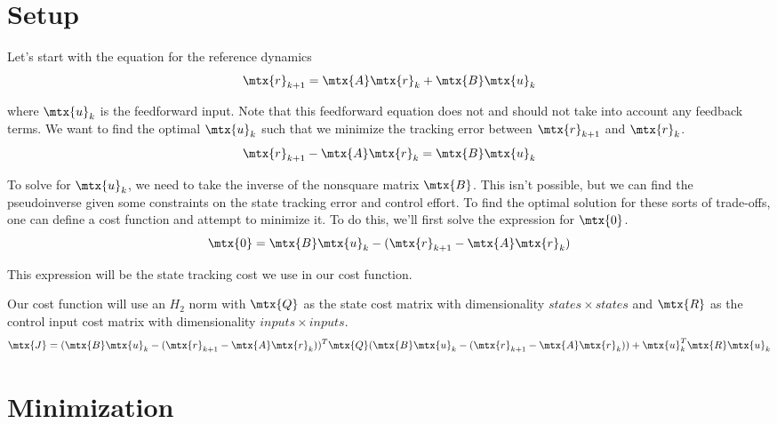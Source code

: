 \section{Setup}

Let's start with the equation for the \gls{reference} dynamics
\begin{equation*}
  \mtx{r}_{k+1} = \mtx{A}\mtx{r}_k + \mtx{B}\mtx{u}_k
\end{equation*}

where $\mtx{u}_k$ is the feedforward input. Note that this feedforward equation
does not and should not take into account any feedback terms. We want to find
the optimal $\mtx{u}_k$ such that we minimize the \gls{tracking} error between
$\mtx{r}_{k+1}$ and $\mtx{r}_k$.
\begin{equation*}
  \mtx{r}_{k+1} - \mtx{A}\mtx{r}_k = \mtx{B}\mtx{u}_k
\end{equation*}

To solve for $\mtx{u}_k$, we need to take the inverse of the nonsquare matrix
$\mtx{B}$. This isn't possible, but we can find the pseudoinverse given some
constraints on the \gls{state} \gls{tracking} error and \gls{control effort}. To
find the optimal solution for these sorts of trade-offs, one can define a cost
function and attempt to minimize it. To do this, we'll first solve the
expression for $\mtx{0}$.
\begin{equation*}
  \mtx{0} = \mtx{B}\mtx{u}_k - (\mtx{r}_{k+1} - \mtx{A}\mtx{r}_k)
\end{equation*}

This expression will be the \gls{state} \gls{tracking} cost we use in our cost
function.

Our cost function will use an $H_2$ norm with $\mtx{Q}$ as the \gls{state} cost
matrix with dimensionality $states \times states$ and $\mtx{R}$ as the
\gls{control input} cost matrix with dimensionality $inputs \times inputs$.
\begin{equation*}
  \mtx{J} = (\mtx{B}\mtx{u}_k - (\mtx{r}_{k+1} - \mtx{A}\mtx{r}_k))^T \mtx{Q}
    (\mtx{B}\mtx{u}_k - (\mtx{r}_{k+1} - \mtx{A}\mtx{r}_k)) +
    \mtx{u}_k^T\mtx{R}\mtx{u}_k
\end{equation*}

\section{Minimization}


